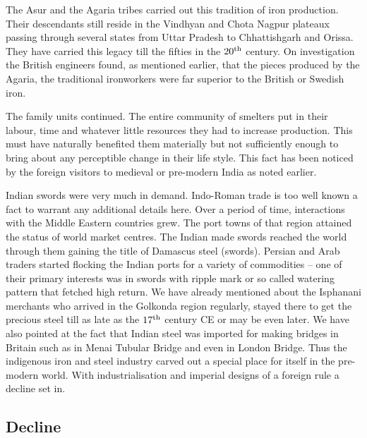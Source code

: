 The Asur and the Agaria tribes carried out this tradition of iron production. Their descendants still reside in the Vindhyan and Chota Nagpur plateaux passing through several states from Uttar Pradesh to Chhattishgarh and Orissa. They have carried this legacy till the fifties in the $20^{\rm th}$ century. On investigation the British engineers found, as mentioned earlier, that the pieces produced by the Agaria, the traditional ironworkers were far superior to the British or Swedish iron.

The family units continued. The entire community of smelters put in their labour, time and whatever little resources they had to increase production. This must have naturally benefited them materially but not sufficiently enough to bring about any perceptible change in their life style. This fact has been noticed by the foreign visitors to medieval or pre-modern India as noted earlier.

Indian swords were very much in demand. Indo-Roman trade is too well known a fact to warrant any additional details here. Over a period of time, interactions with the Middle Eastern countries grew. The port towns of that region attained the status of world market centres. The Indian made swords reached the world through them gaining the title of Damascus steel (swords). Persian and Arab traders started flocking the Indian ports for a variety of commodities – one of their primary interests was in swords with ripple mark or so called watering pattern that fetched high return. We have already mentioned about the Isphanani merchants who arrived in the Golkonda region regularly, stayed there to get the precious steel till as late as the $17^{\rm th}$ century CE or may be even later. We have also pointed at the fact that Indian steel was imported for making bridges in Britain such as in Menai Tubular Bridge and even in London Bridge. Thus the indigenous iron and steel industry carved out a special place for itself in the pre-modern world. With industrialisation and imperial designs of a foreign rule a decline set in.  

\vspace{-.35cm}

\subsection*{Decline}\label{chapter8-subsection-8}

\vspace{-.2cm}


